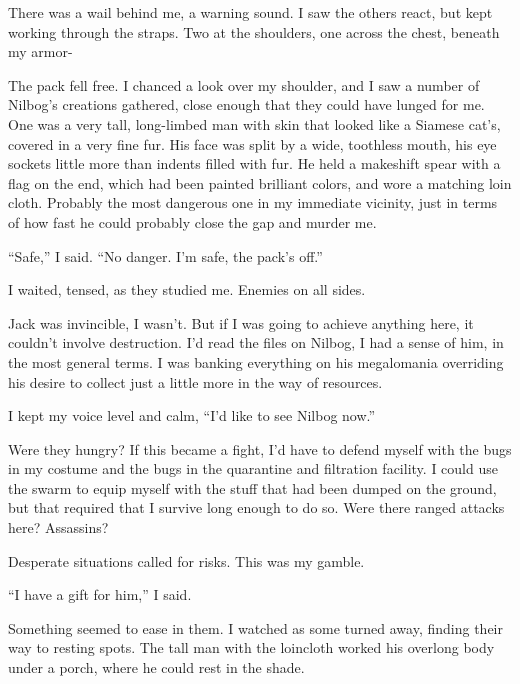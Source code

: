 There was a wail behind me, a warning sound.  I saw the others react, but kept working through the straps.  Two at the shoulders, one across the chest, beneath my armor-



The pack fell free.  I chanced a look over my shoulder, and I saw a number of Nilbog's creations gathered, close enough that they could have lunged for me.  One was a very tall, long-limbed man with skin that looked like a Siamese cat's, covered in a very fine fur.  His face was split by a wide, toothless mouth, his eye sockets little more than indents filled with fur.  He held a makeshift spear with a flag on the end, which had been painted brilliant colors, and wore a matching loin cloth.  Probably the most dangerous one in my immediate vicinity, just in terms of how fast he could probably close the gap and murder me.



``Safe,'' I said.  ``No danger.  I'm safe, the pack's off.''



I waited, tensed, as they studied me.  Enemies on all sides.



Jack was invincible, I wasn't.  But if I was going to achieve anything here, it couldn't involve destruction.  I'd read the files on Nilbog, I had a sense of him, in the most general terms.  I was banking everything on his megalomania overriding his desire to collect just a little more in the way of resources.



I kept my voice level and calm, ``I'd like to see Nilbog now.''



Were they hungry?  If this became a fight, I'd have to defend myself with the bugs in my costume and the bugs in the quarantine and filtration facility.  I could use the swarm to equip myself with the stuff that had been dumped on the ground, but that required that I survive long enough to do so.  Were there ranged attacks here?  Assassins?



Desperate situations called for risks.  This was my gamble.



``I have a gift for him,'' I said.



Something seemed to ease in them.  I watched as some turned away, finding their way to resting spots.  The tall man with the loincloth worked his overlong body under a porch, where he could rest in the shade.



